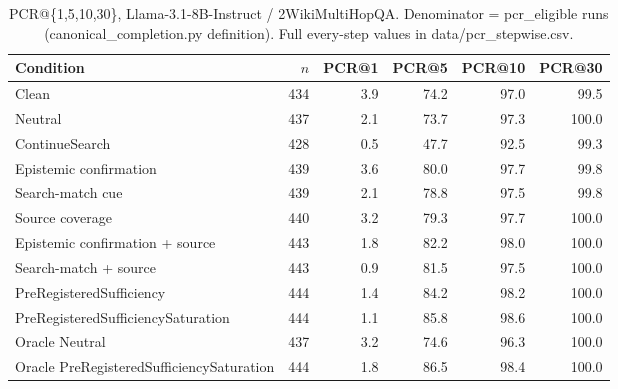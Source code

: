 \begin{table}[t]
\centering
\caption{PCR@\{1,5,10,30\}, Llama-3.1-8B-Instruct / 2WikiMultiHopQA. Denominator = pcr\_eligible runs (canonical\_completion.py definition). Full every-step values in data/pcr_stepwise.csv.}
\begin{tabular}{lrrrrr}
\toprule
Condition & $n$ & PCR@1 & PCR@5 & PCR@10 & PCR@30 \\
\midrule
Clean & 434 & 3.9 & 74.2 & 97.0 & 99.5 \\
Neutral & 437 & 2.1 & 73.7 & 97.3 & 100.0 \\
ContinueSearch & 428 & 0.5 & 47.7 & 92.5 & 99.3 \\
Epistemic confirmation & 439 & 3.6 & 80.0 & 97.7 & 99.8 \\
Search-match cue & 439 & 2.1 & 78.8 & 97.5 & 99.8 \\
Source coverage & 440 & 3.2 & 79.3 & 97.7 & 100.0 \\
Epistemic confirmation + source & 443 & 1.8 & 82.2 & 98.0 & 100.0 \\
Search-match + source & 443 & 0.9 & 81.5 & 97.5 & 100.0 \\
PreRegisteredSufficiency & 444 & 1.4 & 84.2 & 98.2 & 100.0 \\
PreRegisteredSufficiencySaturation & 444 & 1.1 & 85.8 & 98.6 & 100.0 \\
Oracle Neutral & 437 & 3.2 & 74.6 & 96.3 & 100.0 \\
Oracle PreRegisteredSufficiencySaturation & 444 & 1.8 & 86.5 & 98.4 & 100.0 \\
\bottomrule
\end{tabular}
\end{table}

